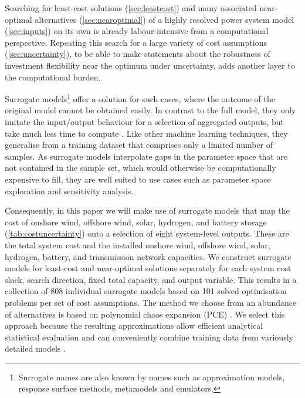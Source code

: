 
Searching for least-cost solutions (\cref{sec:leastcost}) and many associated near-optimal alternatives (\cref{sec:nearoptimal}) of a highly resolved power system model (\cref{sec:inputs}) on its own
is already labour-intensive from a computational perspective.
Repeating this search for a large variety of cost assumptions (\cref{sec:uncertainty}), 
to be able to make statements about the robustness of
investment flexibility near the optimum under uncertainty,
adds another layer to the computational burden.


Surrogate models\footnote{Surrogate names are also known by names such as approximation models, response surface methods, metamodels and emulators.}
offer a solution for such cases, where the outcome of the
original model cannot be obtained easily.
In contrast to the full model, they only imitate the input/output behaviour for a selection of aggregated outputs, but take much less time to compute \cite{palar_multi-fidelity_2016}.
Like other machine learning techniques, they generalise from a
training dataset that comprises only a limited number of samples.
As surrogate models interpolate gaps in the parameter space that are not contained in the sample set,
which would otherwise be computationally expensive to fill,
they are well suited to use cases such as parameter space exploration and sensitivity analysis.


Consequently, in this paper we will make use of surrogate models that map the
cost of onshore wind, offshore wind, solar, hydrogen, and battery storage (\cref{tab:costuncertainty})
onto a selection of eight system-level outputs.
These are the total system cost and the installed onshore wind, offshore wind, solar, hydrogen, battery, and transmission network capacities.
We construct surrogate models for least-cost and near-optimal solutions separately
for each system cost slack, search direction, fixed total capacity, and output variable. This results in a collection of 808 individual surrogate models based on 101 solved optimisation problems
per set of cost assumptions.
The method we choose from an abundance of alternatives is based on polynomial chaos expansion (PCE)
\cite{sudret_global_2008,fajraoui_optimal_2017,gratiet_metamodel-based_2015}.
We select this approach because the resulting approximations
allow efficient analytical statistical evaluation \cite{sudret_global_2008} and
can conveniently combine training data from variously detailed models \cite{palar_multi-fidelity_2016}.

